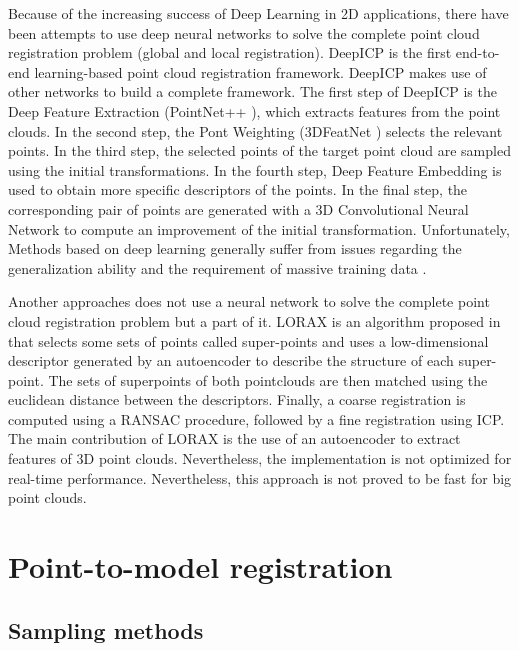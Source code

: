         Because of the increasing success of Deep Learning in 2D applications, there have been attempts to use deep neural networks
        to solve the complete point cloud registration problem (global and local registration).
        DeepICP \cite{Lu_2019_deepicp} is the first end-to-end learning-based point cloud registration framework.
        DeepICP makes use of other networks to build a complete framework.
        The first step of DeepICP is the Deep Feature Extraction (PointNet++ \cite{Qi_2017_pointnet}), which extracts features from the point clouds.
        In the second step, the Pont Weighting (3DFeatNet \cite{Yew_2018_3dfeat}) selects the relevant points.
        In the third step, the selected points of the target point cloud are sampled using the initial transformations.
        In the fourth step, Deep Feature Embedding is used to obtain more specific descriptors of the points.
        In the final step, the corresponding pair of points are generated with a 3D Convolutional Neural Network
        to compute an improvement of the initial transformation.
        Unfortunately, Methods based on deep learning generally suffer from issues regarding the generalization ability and 
        the requirement of massive training data \cite{Quan_2020_com}.

        Another approaches does not use a neural network to solve the complete point cloud registration problem but a part of it.
        LORAX is an algorithm proposed in \cite{Elbaz_2017_3dpoint} that selects some sets of points called super-points and uses a low-dimensional descriptor 
        generated by an autoencoder to describe the structure of each super-point.
        The sets of superpoints of both pointclouds are then matched using the euclidean distance between the descriptors.
        Finally, a coarse registration is computed using a RANSAC procedure, followed by a fine registration using ICP.
        The main contribution of LORAX is the use of an autoencoder to extract features of 3D point clouds. 
        Nevertheless, the implementation is not optimized for real-time performance. Nevertheless, this approach is not 
        proved to be fast for big point clouds.

    \section{Point-to-model registration}

        \subsection{Sampling methods}

